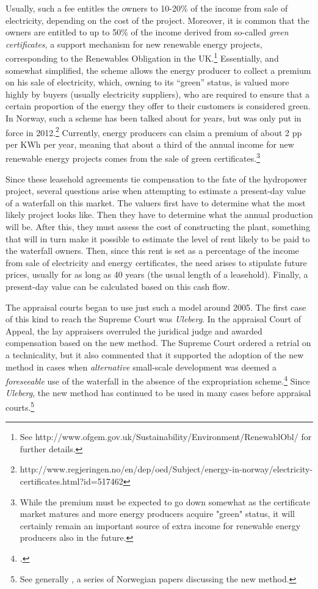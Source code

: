 Usually, such a fee entitles the owners to 10-20\% of the income from sale of electricity, depending on the cost of the project. Moreover, it is common that the owners are entitled to up to 50\% of the income derived from so-called \emph{green certificates}, a support mechanism for new renewable energy projects, corresponding to the Renewables Obligation in the UK.\footnote{See http://www.ofgem.gov.uk/Sustainability/Environment/RenewablObl/ for further details.} Essentially, and somewhat simplified, the scheme allows the energy producer to collect a premium on his sale of electricity, which, owning to its ``green'' status, is valued more highly by buyers (usually electricity suppliers), who are required to ensure that a certain proportion of the energy they offer to their customers is considered green. In Norway, such a scheme has been talked about for years, but was only put in force in 2012.\footnote{http://www.regjeringen.no/en/dep/oed/Subject/energy-in-norway/electricity-certificates.html?id=517462} Currently, energy producers can claim a premium of about 2 pp per KWh per year, meaning that about a third of the annual income for new renewable energy projects comes from the sale of green certificates.\footnote{While the premium must be expected to go down somewhat as the certificate market matures and more energy producers acquire "green" status, it will certainly remain an important source of extra income for renewable energy producers also in the future.}

Since these leasehold agreements tie compensation to the fate of the hydropower project, several questions arise when attempting to estimate a present-day value of a waterfall on this market. The valuers first have to determine what the most likely project looks like. Then they have to determine what the annual production will be. After this, they must assess the cost of constructing the plant, something that will in turn make it possible to estimate the level of rent likely to be paid to the waterfall owners. Then, since this rent is set as a percentage of the income from sale of electricity and energy certificates, the need arises to stipulate future prices, usually for as long as 40 years (the usual length of a leasehold). Finally, a present-day value can be calculated based on this cash flow.

The appraisal courts began to use just such a model around 2005. The first case of this kind to reach the Supreme Court was \emph{Uleberg}. In the appraisal Court of Appeal, the lay appraisers overruled the juridical judge and awarded compensation based on the new method. The Supreme Court ordered a retrial on a technicality, but it also commented that it supported the adoption of the new method in cases when \emph{alternative} small-scale development was deemed a \emph{foreseeable} use of the waterfall in the absence of the expropriation scheme.\footnote{\cite{uleberg08}.} Since \emph{Uleberg}, the new method has continued to be used in many cases before appraisal courts.\footnote{See generally \cite{larsen06,larsen08,larsen11}, a series of Norwegian papers discussing the new method.}

